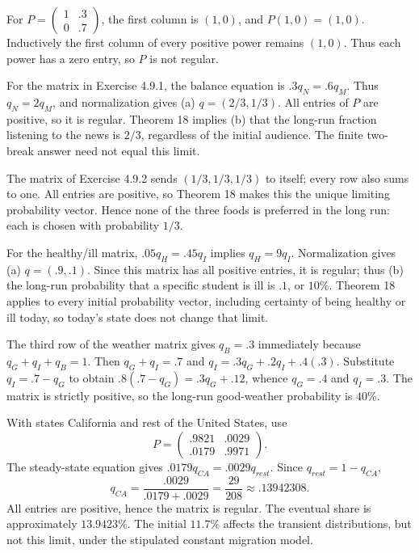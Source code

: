 For $P=\left(\begin{smallmatrix}1&.3\\0&.7\end{smallmatrix}\right)$,
the first column is $(1,0)$, and $P(1,0)=(1,0)$.
Inductively the first column of every positive power remains $(1,0)$.
Thus each power has a zero entry, so $P$ is not regular.

For the matrix in Exercise 4.9.1, the balance equation is $.3q_N=.6q_M$.
Thus $q_N=2q_M$, and normalization gives (a) $q=(2/3,1/3)$.
All entries of $P$ are positive, so it is regular. Theorem 18 implies
(b) that the long-run fraction listening to the news is $2/3$, regardless
of the initial audience. The finite two-break answer need not equal this limit.

The matrix of Exercise 4.9.2 sends $(1/3,1/3,1/3)$ to itself; every row
also sums to one. All entries are positive, so Theorem 18 makes this the
unique limiting probability vector. Hence none of the three foods is preferred
in the long run: each is chosen with probability $1/3$.

For the healthy/ill matrix, $.05q_H=.45q_I$ implies $q_H=9q_I$.
Normalization gives (a) $q=(.9,.1)$.
Since this matrix has all positive entries, it is regular; thus (b) the
long-run probability that a specific student is ill is $.1$, or $10\%$.
Theorem 18 applies to every initial probability vector, including certainty
of being healthy or ill today, so today's state does not change that limit.

The third row of the weather matrix gives $q_B=.3$ immediately because
$q_G+q_I+q_B=1$. Then $q_G+q_I=.7$ and
$q_I=.3q_G+.2q_I+.4(.3)$.
Substitute $q_I=.7-q_G$ to obtain
$.8(.7-q_G)=.3q_G+.12$, whence $q_G=.4$ and $q_I=.3$.
The matrix is strictly positive, so the long-run good-weather probability
is $40\%$.

With states California and rest of the United States, use
\[
 P=\begin{pmatrix}.9821&.0029\\.0179&.9971\end{pmatrix}.
\]
The steady-state equation gives $.0179q_{CA}=.0029q_{rest}$.
Since $q_{rest}=1-q_{CA}$,
\[
 q_{CA}=\frac{.0029}{.0179+.0029}=\frac{29}{208}\approx .13942308.
\]
All entries are positive, hence the matrix is regular. The eventual share
is approximately $13.9423\%$. The initial $11.7\%$ affects the transient
distributions, but not this limit, under the stipulated constant migration model.

